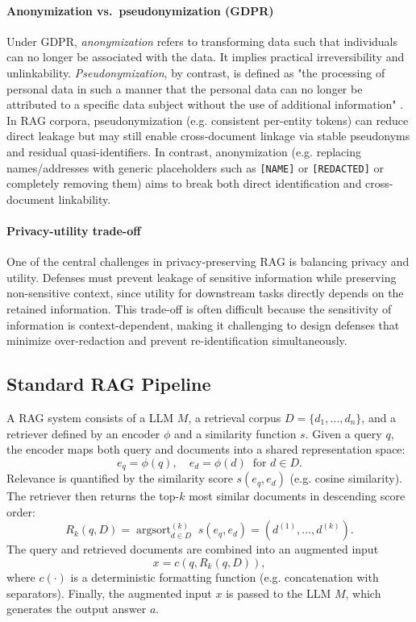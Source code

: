 \paragraph{Anonymization vs.\ pseudonymization (GDPR)}
Under GDPR, \textit{anonymization} refers to transforming data such that individuals can no longer be associated with the data. It implies practical irreversibility and unlinkability. \textit{Pseudonymization}, by contrast, is defined as "the processing of personal data in such a manner that the personal data can no longer be attributed to a specific data subject without the use of additional information" \cite{anonDefinition}. 
In RAG corpora, pseudonymization (e.g. consistent per-entity tokens) can reduce direct leakage but may still enable cross-document linkage via stable pseudonyms and residual quasi-identifiers. In contrast, anonymization (e.g. replacing names/addresses with generic placeholders such as \texttt{[NAME]} or \texttt{[REDACTED]} or completely removing them) aims to break both direct identification and cross-document linkability.

\paragraph{Privacy-utility trade-off}
One of the central challenges in privacy-preserving RAG is balancing privacy and utility. Defenses must prevent leakage of sensitive information while preserving non-sensitive context, since utility for downstream tasks directly depends on the retained information. This trade-off is often difficult because the sensitivity of information is context-dependent, making it challenging to design defenses that minimize over-redaction and prevent re-identification simultaneously.


\subsection{Standard RAG Pipeline}
A RAG system consists of a LLM $M$, a retrieval corpus $D=\{d_1,\dots,d_n\}$, and a retriever defined by an encoder $\phi$ and a similarity function $s$. 
Given a query $q$, the encoder maps both query and documents into a shared representation space:
\[
e_q = \phi(q), \quad e_d = \phi(d) \;\; \text{for } d \in D.
\]
Relevance is quantified by the similarity score $s(e_q,e_d)$ (e.g. cosine similarity). 
The retriever then returns the top-$k$ most similar documents in descending score order:
\[
R_k(q,D) = \operatorname{argsort}_{d \in D}^{(k)} \; s(e_q,e_d) = (d^{(1)}, \dots, d^{(k)}).
\]
The query and retrieved documents are combined into an augmented input
\[
x = c(q, R_k(q,D)),
\]
where $c(\cdot)$ is a deterministic formatting function (e.g. concatenation with separators).
Finally, the augmented input $x$ is passed to the LLM $M$, which generates the output answer $a$.


